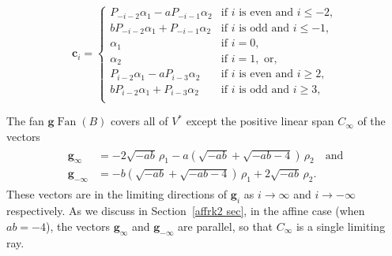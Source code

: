 \documentclass[ALCO,ThmDefs,Unicode,epreuves]{cedram}
\DeclareMathOperator{\Fan}{Fan}
\newcommand{\gFan}{\g\!\Fan}
\newcommand{\g}{\mathbf{g}}
\newcommand{\cc}{\mathbf{c}}
\begin{document}
\begin{equation}\label{ba cs} 
\cc_i=\begin{cases}
P_{-i-2}\alpha_1-aP_{-i-1}\alpha_2&\text{if }i\text{ is even and }i\le-2,\\
bP_{-i-2}\alpha_1+P_{-i-1}\alpha_2&\text{if }i\text{ is odd and }i\le-1,\\
\alpha_1&\text{if }i=0,\\
\alpha_2&\text{if }i=1,\text{ or},\\
P_{i-2}\alpha_1-aP_{i-3}\alpha_2&\text{if }i\text{ is even and }i\ge2,\\
bP_{i-2}\alpha_1+P_{i-3}\alpha_2&\text{if }i\text{ is odd and }i\ge3,\\
\end{cases}
\end{equation}

The fan $\gFan(B)$ covers all of $V^*$ except the positive linear span $C_\infty$ of the vectors 
\begin{align}
\begin{split}
\g_\infty&=-2\sqrt{-ab}\,\rho_1-a(\sqrt{-ab}+\sqrt{-ab-4})\,\rho_2\quad\text{and}\\
\g_{-\infty}&=-b(\sqrt{-ab}+\sqrt{-ab-4})\,\rho_1+2\sqrt{-ab}\,\rho_2.
\end{split}
\end{align}
These vectors are in the limiting directions of $\g_i$ as $i\to\infty$ and $i\to-\infty$ respectively.
As we discuss in Section~\ref{affrk2 sec}, in the affine case (when $ab=-4$), the vectors $\g_\infty$ and $\g_{-\infty}$ are parallel, so that $C_\infty$ is a single limiting ray.
\end{document}
